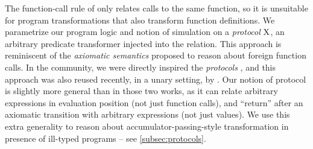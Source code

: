 The function-call rule of \Simuliris only relates calls to the same function, so it is unsuitable for program transformations that also transform function definitions. We parametrize our program logic and notion of simulation on a \emph{protocol} $\mathrm{X}$, an arbitrary predicate transformer injected into the relation. This approach is reminiscent of the \emph{axiomatic semantics} proposed \citet*{axiomatic-semantics-2014} to reason about foreign function calls. In the \Iris community, we were directly inspired the \emph{protocols} \citet*{protocols-2021}, and this approach was also reused recently, in a unary setting, by \citet*{melocoton-2023}. Our notion of protocol is slightly more general than in those two works, as it can relate arbitrary expressions in evaluation position (not just function calls), and ``return'' after an axiomatic transition with arbitrary expressions (not just values). We use this extra generality to reason about accumulator-passing-style transformation in presence of ill-typed programs -- see \cref{subsec:protocols}.

